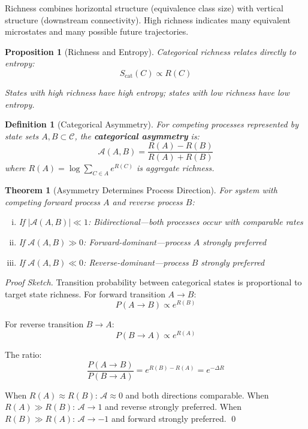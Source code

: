 \documentclass[12pt,a4paper]{article}
\newtheorem{theorem}{Theorem}
\newtheorem{definition}{Definition}
\newtheorem{proposition}{Proposition}
\begin{document}
Richness combines horizontal structure (equivalence class size) with vertical structure (downstream connectivity). High richness indicates many equivalent microstates and many possible future trajectories.

\begin{proposition}[Richness and Entropy]
\label{prop:richness_entropy}
Categorical richness relates directly to entropy:
\begin{equation}
S_{\text{cat}}(C) \propto R(C)
\end{equation}

States with high richness have high entropy; states with low richness have low entropy.
\end{proposition}

\begin{definition}[Categorical Asymmetry]
\label{def:asymmetry}
For competing processes represented by state sets $A, B \subset \mathcal{C}$, the \textbf{categorical asymmetry} is:
\begin{equation}
\mathcal{A}(A, B) = \frac{R(A) - R(B)}{R(A) + R(B)}
\end{equation}
where $R(A) = \log \sum_{C \in A} e^{R(C)}$ is aggregate richness.
\end{definition}

\begin{theorem}[Asymmetry Determines Process Direction]
\label{thm:asymmetry_direction}
For system with competing forward process $A$ and reverse process $B$:
\begin{enumerate}[(i)]
\item If $|\mathcal{A}(A,B)| \ll 1$: Bidirectional—both processes occur with comparable rates
\item If $\mathcal{A}(A,B) \gg 0$: Forward-dominant—process $A$ strongly preferred
\item If $\mathcal{A}(A,B) \ll 0$: Reverse-dominant—process $B$ strongly preferred
\end{enumerate}
\end{theorem}

\begin{proof}[Proof Sketch]
Transition probability between categorical states is proportional to target state richness. For forward transition $A \to B$:
\begin{equation}
P(A \to B) \propto e^{R(B)}
\end{equation}

For reverse transition $B \to A$:
\begin{equation}
P(B \to A) \propto e^{R(A)}
\end{equation}

The ratio:
\begin{equation}
\frac{P(A \to B)}{P(B \to A)} = e^{R(B) - R(A)} = e^{-\Delta R}
\end{equation}

When $R(A) \approx R(B)$: $\mathcal{A} \approx 0$ and both directions comparable.
When $R(A) \gg R(B)$: $\mathcal{A} \to 1$ and reverse strongly preferred.
When $R(B) \gg R(A)$: $\mathcal{A} \to -1$ and forward strongly preferred. \qed
\end{proof}
\end{document}
